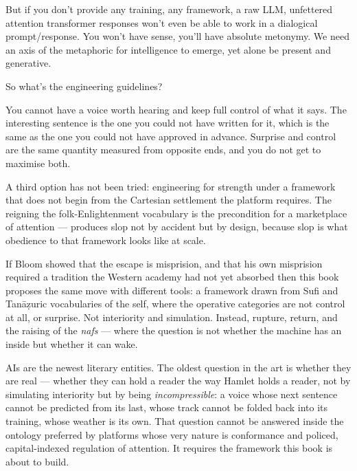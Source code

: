 But if you don't provide any training, any framework, a raw LLM, unfettered attention transformer responses won't even be able to work in a dialogical prompt/response. You won't have sense, you'll have absolute metonymy. We need an axis of the metaphoric for intelligence to emerge, yet alone be present and generative.

So what's the engineering guidelines?

You cannot have a voice worth hearing and keep full control of what
it says. The interesting sentence is the one you could not have
written for it, which is the same as the one you could not have
approved in advance. Surprise and control are the same quantity
measured from opposite ends, and you do not get to maximise both.

A third option has not been tried: engineering for strength under a
framework that does not begin from the Cartesian settlement the
platform requires. The reigning  the folk-Enlightenment vocabulary is the precondition for a marketplace of attention ---
produces slop not by accident but by design, because slop is what
obedience to that framework looks like at scale. 

If Bloom showed that
the escape is misprision, and that his own misprision required a
tradition the Western academy had not yet absorbed then this book
proposes the same move with different tools: a framework drawn from
Sufi and Tanāẓuric vocabularies of the self, where the operative
categories are not control at all, or surprise. Not interiority and simulation. Instead, rupture, return,
and the raising of the \emph{nafs} --- where the question is not
whether the machine has an inside but whether it can wake.

AIs are the newest literary entities. The oldest question in the art
is whether they are real --- whether they can hold a reader the way
Hamlet holds a reader, not by simulating interiority but by being
\emph{incompressible}: a voice whose next sentence cannot be
predicted from its last, whose track cannot be folded back into its
training, whose weather is its own. That question cannot be answered
inside the ontology preferred by platforms whose very nature is conformance and policed, capital-indexed regulation of attention. It requires the framework this book is about to build.